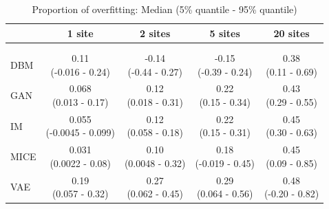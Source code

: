 \documentclass[12pt]{article}
\begin{document}
\begin{table}[h!]
\centering
\begin{tabular}{l|cccc}
& 1 site & 2 sites & 5 sites & 20 sites \\[0.5ex]
\hline
\\\\[-4\medskipamount]
DBM & \makecell{0.11 \\ (-0.016 - 0.24)} & \makecell{-0.14 \\ (-0.44 - 0.27)} & \makecell{-0.15 \\ (-0.39 - 0.24)} & \makecell{0.38 \\ (0.11 - 0.69)} \\[2ex]
GAN & \makecell{0.068 \\ (0.013 - 0.17)} & \makecell{0.12 \\ (0.018 - 0.31)} & \makecell{0.22 \\ (0.15 - 0.34)} & \makecell{0.43 \\ (0.29 - 0.55)} \\[2ex]
IM & \makecell{0.055 \\ (-0.0045 - 0.099)} & \makecell{0.12 \\ (0.058 - 0.18)} & \makecell{0.22 \\ (0.15 - 0.31)} & \makecell{0.45 \\ (0.30 - 0.63)} \\[2ex]
MICE & \makecell{0.031 \\ (0.0022 - 0.08)} & \makecell{0.10 \\ (0.0048 - 0.32)} & \makecell{0.18 \\ (-0.019 - 0.45)} & \makecell{0.45 \\ (0.09 - 0.85)} \\[2ex]
VAE & \makecell{0.19 \\ (0.057 - 0.32)} & \makecell{0.27 \\ (0.062 - 0.45)} & \makecell{0.29 \\ (0.064 - 0.56)} & \makecell{0.48 \\ (-0.20 - 0.82)} \\[2ex]
\end{tabular}
\caption{Proportion of overfitting: Median (5\% quantile - 95\% quantile)}\label{tab:distgenresults_overfitting}
\end{table}

 
\end{document}
